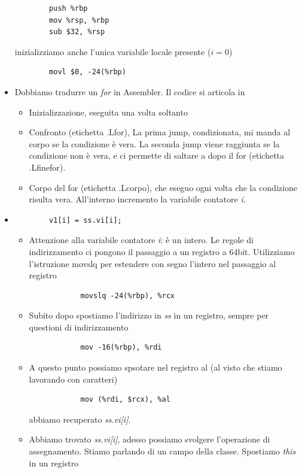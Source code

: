 \begin{itemize}
\begin{verbatim}
		push %rbp
		mov %rsp, %rbp
		sub $32, %rsp
	\end{verbatim}
	inizializziamo anche l'unica variabile locale presente ($i=0$)
	\begin{verbatim}
		movl $0, -24(%rbp)
	\end{verbatim}
	\item Dobbiamo tradurre un \emph{for} in Assembler. Il codice si articola in
	\begin{itemize}
		\item Inizializzazione, eseguita una volta soltanto
		\item Confronto (etichetta .Lfor), La prima jump, condizionata, mi manda al corpo se la condizione è vera. La seconda jump viene raggiunta se la condizione non è vera, e ci permette di saltare a dopo il for (etichetta .Lfinefor).
		\item Corpo del for (etichetta .Lcorpo), che eseguo ogni volta che la condizione risulta vera. All'interno incremento la variabile contatore \emph{i}.
	\end{itemize}
	\item \begin{verbatim}
		v1[i] = ss.vi[i];
	\end{verbatim}
	\begin{itemize}
		\item Attenzione alla variabile contatore \emph{i}: è un intero. Le regole di indirizzamento ci pongono il passaggio a un registro a 64bit. Utilizziamo l'istruzione movslq per estendere con segno l'intero nel passaggio al registro
		\begin{verbatim}
			movslq -24(%rbp), %rcx
		\end{verbatim}
		\item Subito dopo spostiamo l'indirizzo in \emph{ss} in un registro, sempre per questioni di indirizzamento
		\begin{verbatim}
			mov -16(%rbp), %rdi
		\end{verbatim}
		\item A questo punto possiamo spsotare nel registro al (al visto che stiamo lavorando con caratteri)
		\begin{verbatim}
			mov (%rdi, $rcx), %al
		\end{verbatim}
		abbiamo recuperato \emph{ss.vi[i]}.
		\item Abbiamo trovato \emph{ss.vi[i]}, adesso possiamo svolgere l'operazione di assegnamento. Stiamo parlando di un campo della classe. Spostiamo \emph{this} in un registro
		\begin{verbatim}

\end{verbatim}
\end{itemize}
\end{itemize}
